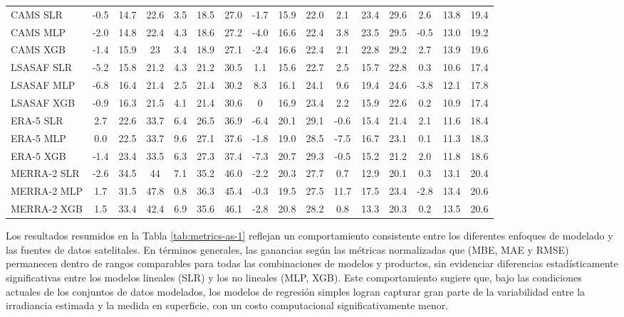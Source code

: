 \begin{table}[h]
{\begin{tabular}{|l|ccc|ccc|ccc|ccc|ccc|}
      \hline
      CAMS SLR    &  -0.5 & 14.7 & 22.6 &  3.5 & 18.5 & 27.0 & -1.7 & 15.9 & 22.0 &  2.1 & 23.4 & 29.6 &  2.6 & 13.8 & 19.4 \\
      CAMS MLP    & -2.0 & 14.8 & 22.4 &  4.3 & 18.6 & 27.2 & -4.0 & 16.6 & 22.4 &  3.8 & 23.5 & 29.5 & -0.5 & 13.0 & 19.2 \\
	  CAMS XGB    & -1.4& 15.9 & 23   &  3.4 & 18.9 & 27.1 & -2.4 & 16.6 & 22.4 &  2.1 & 22.8 & 29.2 &  2.7 & 13.9 & 19.6 \\      
      \hline
      LSASAF SLR  &  -5.2 & 15.8 & 21.2 &  4.3 & 21.2 & 30.5 &  1.1 & 15.6 & 22.7 &  2.5 & 15.7 & 22.8 &  0.3 & 10.6 & 17.4 \\
      LSASAF MLP  & -6.8 & 16.4 & 21.4 &  2.5 & 21.4 & 30.2 &  8.3 & 16.1 & 24.1 &  9.6 & 19.4 & 24.6 & -3.8 & 12.1 & 17.8 \\
      LSASAF XGB  & -0.9& 16.3 & 21.5 &  4.1 & 21.4 & 30.6 &  0 & 16.9 & 23.4 &  2.2 & 15.9 & 22.6 &  0.2 & 10.9 & 17.4 \\
      
      \hline
      ERA-5 SLR   &   2.7 & 22.6 & 33.7 &  6.4 & 26.5 & 36.9 & -6.4 & 20.1 & 29.1 & -0.6 & 15.4 & 21.4 &  2.1 & 11.6 & 18.4 \\     
      ERA-5 MLP   & 0.0  & 22.5 & 33.7 &  9.6 & 27.1 & 37.6 & -1.8 & 19.0 & 28.5 & -7.5 & 16.7 & 23.1 &  0.1 & 11.3 & 18.3 \\ 
      ERA-5 XGB   & -1.4& 23.4 & 33.5 &  6.3 & 27.3 & 37.4 & -7.3 & 20.7 & 29.3 & -0.5 & 15.2 & 21.2 &  2.0 & 11.8 & 18.6 \\
      \hline
      MERRA-2 SLR &  -2.6 & 34.5 & 44   &  7.1 & 35.2 & 46.0 & -2.2 & 20.3 & 27.7 &  0.7 & 12.9 & 20.1 &  0.3 & 13.1 & 20.4 \\
      MERRA-2 MLP & 1.7  & 31.5 & 47.8 &  0.8 & 36.3 & 45.4 & -0.3 & 19.5 & 27.5 & 11.7 & 17.5 & 23.4 & -2.8 & 13.4 & 20.6 \\
      MERRA-2 XGB & 1.5 & 33.4 & 42.4 & 6.9 & 35.6 & 46.1 & -2.8 & 20.8 & 28.2 &  0.8 & 13.3 & 20.3 &  0.2 & 13.5 & 20.6 \\
      \hline
    \end{tabular}%
  }
\end{table}


Los resultados resumidos en la Tabla \ref{tab:metrics-as-1} reflejan un comportamiento consistente entre los diferentes enfoques de modelado y las fuentes de datos satelitales. En términos generales, las ganancias según las métricas normalizadas que (MBE, MAE y RMSE) permanecen dentro de rangos comparables para todas las combinaciones de modelos y productos, sin evidenciar diferencias estadísticamente significativas entre los modelos lineales (SLR) y los no lineales (MLP, XGB). Este comportamiento sugiere que, bajo las condiciones actuales de los conjuntos de datos modelados, los modelos de regresión simples logran capturar gran parte de la variabilidad entre la irradiancia estimada y la medida en superficie, con un costo computacional significativamente menor.\\

